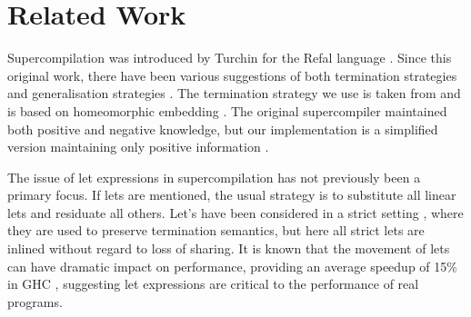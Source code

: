 \documentclass{llncs}
\begin{document}
\begin{comment}
\subsection{Termination Bound}
\label{sec:results_bound}

Table \ref{tab:haskell_results} includes a column indicating the size bound that was applied to expressions. Out of the five benchmarks, both primes and queens could be run at any greater bound and would still produce the same program -- the direct repetition criteria (see \S\ref{sec:direct}) bounds the expressions on its own. For the remaining programs, a bound was chosen to ensure that the compilation process was quick (under two seconds). By increasing the termination bound the size of the residual program would increase, but the generated program may execute faster.

The existence of a termination bound requiring different values for different programs is a cause for concern. In a large program it is likely that different parts of the program would require different bounds on the size of the generated expression -- something not currently possible. We suspect that the most promising direction is to augment the direct repetition criterion to obtain termination in all practical cases without resorting to a depth bound.
\end{comment}

\section{Related Work}
\label{sec:related}

Supercompilation \cite{supercompilation,turchin:experiments} was introduced by Turchin for the Refal language \cite{refal}. Since this original work, there have been various suggestions of both termination strategies and generalisation strategies \cite{turchin:generalisation}. The termination strategy we use is taken from \cite{sorensen:supercompilation} and is based on homeomorphic embedding \cite{leuschel:homeomorphic}. The original supercompiler maintained both positive and negative knowledge, but our implementation is a simplified version maintaining only positive information \cite{secher:perfect_supercompilation}.

The issue of let expressions in supercompilation has not previously been a primary focus. If lets are mentioned, the usual strategy is to substitute all linear lets and residuate all others. Let's have been considered in a strict setting \cite{jonsson:supercompilation}, where they are used to preserve termination semantics, but here all strict lets are inlined without regard to loss of sharing. It is known that the movement of lets can have dramatic impact on performance, providing an average speedup of 15\% in GHC \cite{spj:letfloating}, suggesting let expressions are critical to the performance of real programs.
\end{document}
